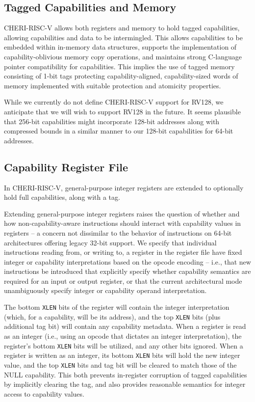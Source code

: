 \subsection{Tagged Capabilities and Memory}

CHERI-RISC-V allows both registers and memory to hold tagged capabilities,
allowing capabilities and data to be intermingled.
This allows capabilities to be embedded within in-memory data structures,
supports the implementation of capability-oblivious memory copy operations,
and maintains strong C-language pointer compatibility for capabilities.
This implies the use of tagged memory consisting of 1-bit
tags protecting capability-aligned, capability-sized words of memory
implemented with suitable protection and atomicity properties.

While we currently do not define CHERI-RISC-V support for RV128, we anticipate
that we will wish to support RV128 in the future.
It seems plausible that 256-bit capabilities might incorporate 128-bit
addresses along with compressed bounds in a similar manner to our 128-bit
capabilities for 64-bit addresses.

\subsection{Capability Register File}

In CHERI-RISC-V,
general-purpose integer registers are extended to optionally hold
full
capabilities, along with a tag.

Extending general-purpose integer registers raises the
question of whether and how non-capability-aware instructions should
interact with capability values in registers -- a concern not dissimilar to
the behavior of instructions on 64-bit architectures offering legacy 32-bit
support.
We specify that individual instructions reading from, or writing to, a
register in the register file have fixed integer or capability interpretations
based on the opcode encoding -- i.e., that new instructions be introduced that
explicitly specify whether capability semantics are required for an input or
output register, or that the current architectural mode unambiguously specify
integer or capability operand interpretation.

The bottom \texttt{XLEN} bits of the register will contain the integer
interpretation (which, for a capability, will be its address), and the
top \texttt{XLEN} bits (plus additional tag bit) will contain any capability
metadata.
When a register is read as an integer (i.e., using an opcode that dictates an
integer interpretation),
the register's bottom \texttt{XLEN} bits will be utilized, and any other bits ignored.
When a register is written as an integer, its bottom \texttt{XLEN} bits will
hold the new
integer value, and the top \texttt{XLEN} bits and tag bit will be cleared to match
those of the NULL capability. This both prevents in-register corruption of tagged
capabilities by implicitly clearing the tag, and also provides reasonable semantics
for integer access to capability values.

